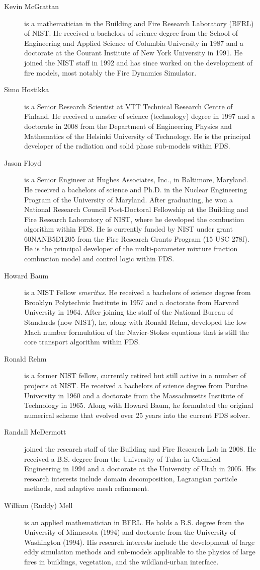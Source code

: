 \documentclass[11pt]{book}
\begin{document}
\begin{description}
\item[Kevin McGrattan] is a mathematician in the Building and Fire Research Laboratory (BFRL) of NIST. He received a bachelors of science degree from
the School of Engineering and Applied Science of Columbia University in 1987 and a doctorate at the Courant Institute
of New York University in 1991. He joined the NIST staff in 1992 and has since worked on the development of fire models, most notably the
Fire Dynamics Simulator.
\item[Simo Hostikka] is a Senior Research Scientist at VTT Technical
Research Centre of Finland. He received a master of science
(technology) degree in 1997 and a doctorate in 2008 from
the Department of Engineering Physics and Mathematics of the
Helsinki University of Technology.  He is the principal developer of the
radiation and solid phase sub-models within FDS.
\item[Jason Floyd] is a Senior Engineer at Hughes Associates, Inc., in Baltimore, Maryland. He received a bachelors of science and Ph.D. in the Nuclear Engineering
Program of the University of Maryland. After graduating, he won a National Research Council Post-Doctoral Fellowship at the Building and Fire
Research Laboratory of NIST, where he developed the combustion algorithm within FDS. He is currently funded by NIST under grant 60NANB5D1205 from the Fire Research Grants Program (15 USC 278f).
He is the principal developer of the multi-parameter mixture fraction combustion model and control logic within FDS.
\item[Howard Baum] is a NIST Fellow {\em emeritus}. He received a bachelors of science degree from Brooklyn Polytechnic Institute in 1957 and a
doctorate from Harvard University in 1964. After joining the staff of the National Bureau of Standards (now NIST), he, along with Ronald Rehm,
developed the low Mach number formulation of the Navier-Stokes equations that is still the core transport algorithm within FDS.
\item[Ronald Rehm] is a former NIST fellow, currently retired but still active in a number of projects at NIST. He received a bachelors of science
degree from Purdue University in 1960 and a doctorate from the Massachusetts Institute of Technology in 1965. Along with Howard Baum, he
formulated the original numerical scheme that evolved over 25 years into the current FDS solver.
\item[Randall McDermott] joined the research staff of the Building and Fire Research Lab in 2008. He received a B.S. degree from the University of Tulsa in
Chemical Engineering in 1994 and a doctorate at the University of Utah in 2005. His research interests include domain decomposition, Lagrangian particle methods, and
adaptive mesh refinement.
\item[William (Ruddy) Mell] is an applied mathematician in BFRL. He holds a B.S. degree from the University of Minnesota (1994) and doctorate from the
University of Washington (1994). His research interests include the development of large eddy simulation methods and sub-models applicable to the
physics of large fires in buildings, vegetation, and the wildland-urban interface.
\end{description}
\end{document}
